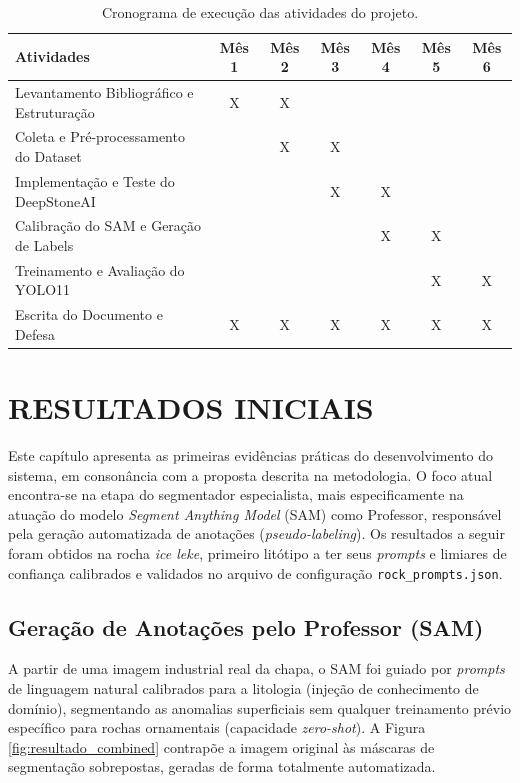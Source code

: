 \begin{table}[htpb]
    \centering
    \caption{Cronograma de execução das atividades do projeto.}
    \vspace{0.2cm}
    \begin{tabular}{|p{6cm}|c|c|c|c|c|c|}
        \hline
        \textbf{Atividades} & \textbf{Mês 1} & \textbf{Mês 2} & \textbf{Mês 3} & \textbf{Mês 4} & \textbf{Mês 5} & \textbf{Mês 6} \\ \hline
        Levantamento Bibliográfico e Estruturação & X & X & & & & \\ \hline
        Coleta e Pré-processamento do Dataset & & X & X & & & \\ \hline
        Implementação e Teste do DeepStoneAI & & & X & X & & \\ \hline
        Calibração do SAM e Geração de Labels & & & & X & X & \\ \hline
        Treinamento e Avaliação do YOLO11 & & & & & X & X \\ \hline
        Escrita do Documento e Defesa & X & X & X & X & X & X \\ \hline
    \end{tabular}
    \label{tab:cronograma}
\end{table}

\chapter[RESULTADOS INICIAIS]{RESULTADOS INICIAIS}

Este capítulo apresenta as primeiras evidências práticas do desenvolvimento do sistema, em consonância com a proposta descrita na metodologia. O foco atual encontra-se na etapa do segmentador especialista, mais especificamente na atuação do modelo \textit{Segment Anything Model} (SAM) como Professor, responsável pela geração automatizada de anotações (\textit{pseudo-labeling}). Os resultados a seguir foram obtidos na rocha \textit{ice leke}, primeiro litótipo a ter seus \textit{prompts} e limiares de confiança calibrados e validados no arquivo de configuração \texttt{rock\_prompts.json}.

\section{Geração de Anotações pelo Professor (SAM)}
A partir de uma imagem industrial real da chapa, o SAM foi guiado por \textit{prompts} de linguagem natural calibrados para a litologia (injeção de conhecimento de domínio), segmentando as anomalias superficiais sem qualquer treinamento prévio específico para rochas ornamentais (capacidade \textit{zero-shot}). A Figura \ref{fig:resultado_combined} contrapõe a imagem original às máscaras de segmentação sobrepostas, geradas de forma totalmente automatizada.

